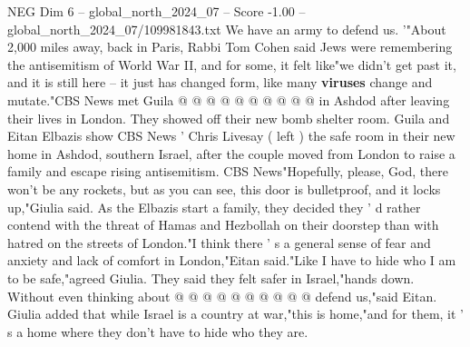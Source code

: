 \begin{textsample}{NEG Dim 6 – global\_north\_2024\_07 – Score -1.00 – global\_north\_2024\_07/109981843.txt}
We have an army to defend us. '"About 2,000 miles away, back in Paris, Rabbi Tom Cohen said Jews were remembering the antisemitism of World War II, and for some, it felt like"we didn't get past it, and it is still here -- it just has changed form, like many \textbf{viruses} change and mutate."CBS News met Guila @ @ @ @ @ @ @ @ @ @ in Ashdod after leaving their lives in London.
They showed off their new bomb shelter room.
Guila and Eitan Elbazis show CBS News ' Chris Livesay ( left ) the safe room in their new home in Ashdod, southern Israel, after the couple moved from London to raise a family and escape rising antisemitism.
CBS News"Hopefully, please, God, there won't be any rockets, but as you can see, this door is bulletproof, and it locks up,"Giulia said.
As the Elbazis start a family, they decided they ' d rather contend with the threat of Hamas and Hezbollah on their doorstep than with hatred on the streets of London."I think there ' s a general sense of fear and anxiety and lack of comfort in London,"Eitan said."Like I have to hide who I am to be safe,"agreed Giulia.
They said they felt safer in Israel,"hands down.
Without even thinking about @ @ @ @ @ @ @ @ @ @ defend us,"said Eitan.
Giulia added that while Israel is a country at war,"this is home,"and for them, it ' s a home where they don't have to hide who they are.

\end{textsample}
